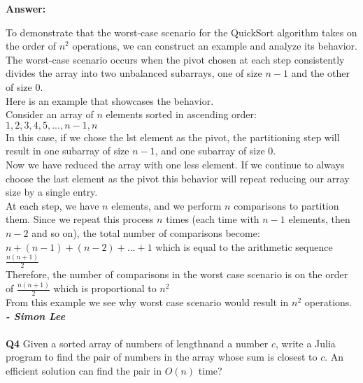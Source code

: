 \documentclass[8pt]{article}
\begin{document}
\textbf{Answer:}

To demonstrate that the worst-case scenario for the QuickSort algorithm takes on the order of \(n^2\) operations, we can construct an example and analyze its behavior. The worst-case scenario occurs when the pivot chosen at each step consistently divides the array into two unbalanced subarrays, one of size 
\(n-1\) and the other of size 0.\\

Here is an example that showcases the behavior. \\ 

Consider an array of $n$ elements sorted in ascending order: \\ 

\(1,2,3,4,5,...,n-1,n\) \\

In this case, if we chose the lst element as the pivot, the partitioning step will result in one subarray of size \(n-1\), and one subarray of size 0. \\

Now we have reduced the array with one less element. If we continue to always choose the last element as the pivot this behavior will repeat reducing our array size by a single entry. \\

At each step, we have $n$ elements, and we perform $n$ comparisons to partition them. Since we repeat this process $n$ times (each time with \(n-1\) elements, then \(n-2\) and so on), the total number of comparisons become: \\ 

\(n + (n-1) + (n-2) + ... + 1 \) which is equal to the arithmetic sequence \(\frac{n(n+1)}{2}\) \\

Therefore, the number of comparisons in the worst case scenario is on the order of \(\frac{n(n+1)}{2}\) which is proportional to $n^2$ \\

From this example we see why worst case scenario would result in $n^2$ operations. \\

\textbf{\textit{- Simon Lee }} \\\\

\textbf{Q4} Given a sorted array of numbers of lengthnand a number $c$, write a Julia program to find the pair of numbers in the array whose sum is closest to $c$. An efficient solution can find the pair in $O(n)$ time?\\
\end{document}
